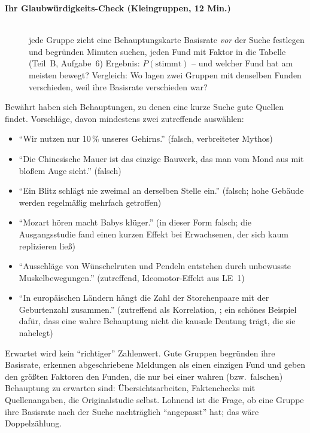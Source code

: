 \begin{description}
\item[{\rot\bf Ihr Glaubwürdigkeits-Check (Kleingruppen, 12 Min.)}]~\\[-\lblskip]
\bi
  \ite jede Gruppe zieht eine Behauptungskarte
  \ite Basisrate \emph{vor} der Suche festlegen und begründen
   Minuten suchen, jeden Fund mit Faktor in die Tabelle
    (Teil~B, Aufgabe~6)
  \ite Ergebnis: $P(\text{stimmt})$ -- und welcher Fund hat am meisten
    bewegt?
  \ite Vergleich: Wo lagen zwei Gruppen mit denselben Funden verschieden,
    weil ihre Basisrate verschieden war?
\ei
\os{\newpage}
\end{description}

\begin{lehrhinweis}
Bewährt haben sich Behauptungen, zu denen eine kurze Suche gute Quellen
findet. Vorschläge, davon mindestens zwei zutreffende auswählen:
\begin{itemize}
  \item \enquote{Wir nutzen nur 10\,\% unseres Gehirns.} (falsch,
    verbreiteter Mythos)
  \item \enquote{Die Chinesische Mauer ist das einzige Bauwerk, das man
    vom Mond aus mit bloßem Auge sieht.} (falsch)
  \item \enquote{Ein Blitz schlägt nie zweimal an derselben Stelle ein.}
    (falsch; hohe Gebäude werden regelmäßig mehrfach getroffen)
  \item \enquote{Mozart hören macht Babys klüger.} (in dieser Form falsch;
    die Ausgangsstudie fand einen kurzen Effekt bei Erwachsenen, der sich
    kaum replizieren ließ)
  \item \enquote{Ausschläge von Wünschelruten und Pendeln entstehen durch
    unbewusste Muskelbewegungen.} (zutreffend, Ideomotor-Effekt aus LE~1)
  \item \enquote{In europäischen Ländern hängt die Zahl der
    Storchenpaare mit der Geburtenzahl zusammen.} (zutreffend als
    Korrelation, \textcite{matthews2000storks}; ein schönes Beispiel
    dafür, dass eine wahre Behauptung nicht die kausale Deutung trägt,
    die sie nahelegt)
\end{itemize}
Erwartet wird kein \enquote{richtiger} Zahlenwert. Gute Gruppen begründen
ihre Basisrate, erkennen abgeschriebene Meldungen als einen einzigen
Fund und geben den größten Faktoren den Funden, die nur bei einer
wahren (bzw.\ falschen) Behauptung zu erwarten sind: Übersichtsarbeiten,
Faktenchecks mit Quellenangaben, die Originalstudie selbst. Lohnend ist
die Frage, ob eine Gruppe ihre Basisrate nach der Suche nachträglich
\enquote{angepasst} hat; das wäre Doppelzählung.
\end{lehrhinweis}

